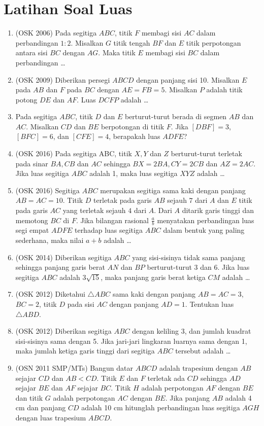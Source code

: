 \documentclass[12pt]{scrartcl}
\begin{document}
\section{Latihan Soal Luas}
\begin{enumerate}
\item (OSK 2006) Pada segitiga $ABC$, titik $F$ membagi sisi $AC$ dalam perbandingan $1 : 2$. Misalkan $G$ titik tengah $BF$ dan $E$ titik perpotongan antara sisi $BC$ dengan $AG$. Maka titik $E$ membagi sisi $BC$ dalam perbandingan \dots

\item (OSK 2009) Diberikan persegi $ABCD$ dengan panjang sisi 10. Misalkan $E$ pada $AB$ dan $F$ pada $BC$ dengan $AE = FB = 5$. Misalkan $P$ adalah titik potong $DE$ dan $AF$. Luas $DCFP$ adalah \dots

\item Pada segitiga $ABC$, titik $D$ dan $E$ berturut-turut berada di segmen $AB$ dan $AC$. Misalkan $CD$ dan $BE$ berpotongan di titik $F$. Jika $[DBF]=3$, $[BFC]=6$, dan $[CFE]=4$, berapakah luas $ADFE$?

\item (OSK 2016) Pada segitiga ABC, titik $X, Y$ dan $Z$ berturut-turut terletak pada sinar $BA, CB$ dan $AC$ sehingga $BX = 2BA, CY = 2CB$ dan $AZ = 2AC$. Jika luas segitiga $ABC$ adalah 1, maka luas segitiga $XYZ$ adalah \dots

\item (OSK 2016) Segitiga $ABC$ merupakan segitiga sama kaki dengan panjang $AB = AC = 10 $. Titik $D$ terletak pada garis $AB$ sejauh $7 $ dari $A$ dan $E$ titik pada garis $AC$ yang terletak sejauh $4 $ dari $A$. Dari $A$ ditarik garis tinggi dan memotong $BC$ di $F$. Jika bilangan rasional $\frac{a}{b}$ menyatakan perbandingan luas segi empat $ADFE$ terhadap luas segitiga $ABC$ dalam bentuk yang paling sederhana, maka nilai $a + b$ adalah \dots

\item (OSK 2014) Diberikan segitiga $ABC$ yang sisi-sisinya tidak sama panjang sehingga panjang garis berat $AN$ dan $BP$ berturut-turut 3 dan 6. Jika luas segitiga $ABC$ adalah $3\sqrt{15}$, maka panjang garis berat ketiga $CM$ adalah \dots

\item (OSK 2012) Diketahui $\triangle ABC$ sama kaki dengan panjang $AB = AC = 3$, $BC = 2$, titik $D$ pada sisi $AC$ dengan panjang $AD = 1$. Tentukan luas $\triangle ABD$.

\item (OSK 2012) Diberikan segitiga $ABC$ dengan keliling 3, dan jumlah kuadrat sisi-sisinya sama dengan 5. Jika jari-jari lingkaran luarnya sama dengan 1, maka jumlah ketiga garis tinggi dari segitiga $ABC$ tersebut adalah \dots

\item (OSN 2011 SMP/MTs) Bangun datar $ABCD$ adalah trapesium dengan $AB$ sejajar $CD$ dan $AB < CD$. Titik $E$ dan $F$ terletak ada $CD$ sehingga $AD$ sejajar $BE$ dan $AF$ sejajar $BC$. Titik $H$  adalah perpotongan $AF$ dengan $BE$ dan titik $G$ adalah  perpotongan $AC$ dengan $BE$. Jika panjang $AB$ adalah 4 cm dan panjang $CD$ adalah 10 cm hitunglah perbandingan luas  segitiga $AGH$ dengan luas trapesium $ABCD$. 
\end{enumerate}
\end{document}
